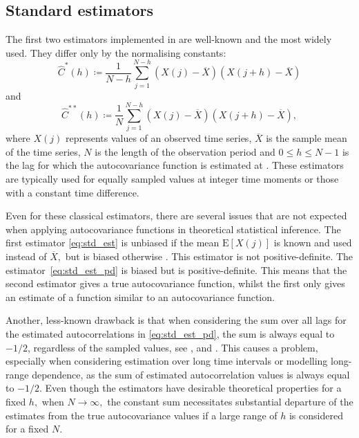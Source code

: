 \subsection{Standard estimators}\label{standard-estimators}

The first two estimators implemented in  are well-known
and the most widely used. They differ only by the normalising constants:
\begin{equation}
 \label{eq:std_est}
\widehat{C}^{*}(h) \coloneq \frac{1}{N-h} \sum_{j=1}^{N - h} \left(X(j) - \overline{X}\right) \left(X(j+h) - \overline{X}\right)
\end{equation} and \begin{equation}
 \label{eq:std_est_pd}
\widehat{C}^{**}(h) \coloneq \frac{1}{N} \sum_{j=1}^{N - h} \left(X(j) - \overline{X}\right) \left(X(j+h) - \overline{X}\right) ,
\end{equation} where \(X(j)\) represents values of an observed time
series, \(\overline{X}\) is the sample mean of the time series, \(N\) is
the length of the observation period and \(0 \leq h \leq N-1\) is the
lag for which the autocovariance function is estimated at
\citep[Section~3.17]{Yaglom1987}. These estimators are typically used
for equally sampled values at integer time moments or those with a
constant time difference.

Even for these classical estimators, there are several issues that are
not expected when applying autocovariance functions in theoretical
statistical inference. The first estimator \eqref{eq:std_est} is
unbiased if the mean \(\text{E}[X(j)]\) is known and used instead of
\(\overline{X},\) but is biased otherwise \citep{Brockwell2016}. This
estimator is not positive-definite. The estimator~\eqref{eq:std_est_pd}
is biased but is positive-definite. This means that the second estimator
gives a true autocovariance function, whilst the first only gives an
estimate of a function similar to an autocovariance function.

Another, less-known drawback is that when considering the sum over all
lags for the estimated autocorrelations in \eqref{eq:std_est_pd}, the
sum is always equal to \(-1/2\), regardless of the sampled values, see
\cite{Hassani2009}, \citet{Hassani2012} and
\cite{Bilchouris_Olenko_2025}. This causes a problem, especially when
considering estimation over long time intervals or modelling long-range
dependence, as the sum of estimated autocorrelation values is always
equal to \(-1/2\). Even though the estimators have desirable theoretical
properties for a fixed \(h,\) when \(N  \rightarrow \infty ,\) the
constant sum necessitates substantial departure of the estimates from
the true autocovariance values if a large range of \(h\) is considered
for a fixed \(N.\)

